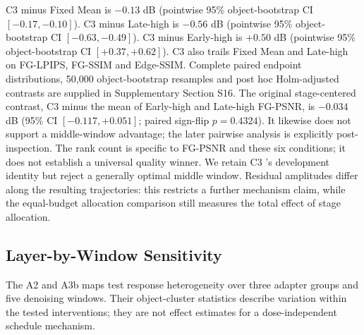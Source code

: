 \documentclass[times,twocolumn,final]{elsarticle}
\providecommand{\DIFadd}[1]{{\protect\color{blue} \sf #1}} %
\providecommand{\DIFaddbegin}{} %
\providecommand{\DIFaddend}{} %
\begin{document}
  \DIFaddbegin \DIFadd{C3 minus Fixed Mean is $-0.13$ dB (pointwise 95\% object-bootstrap CI $[-0.17,-0.10]$). C3 minus Late-high is $-0.56$ dB (pointwise 95\% object-bootstrap CI $[-0.63,-0.49]$). C3 minus Early-high is $+0.50$ dB (pointwise 95\% object-bootstrap CI $[+0.37,+0.62]$). C3 also trails Fixed Mean and Late-high on FG-LPIPS, }\DIFaddend FG-SSIM and   \DIFaddbegin \DIFadd{Edge-SSIM. Complete paired endpoint distributions, 50,000 object-bootstrap resamples and post hoc Holm-adjusted contrasts are supplied in Supplementary Section S16. The original stage-centered contrast, C3 minus the mean of Early-high and Late-high FG-PSNR, is $-0.034$ dB (95\% CI $[-0.117,+0.051]$; paired sign-flip $p=0.4324$)}\DIFaddend .   \DIFaddbegin \DIFadd{It likewise does not support a middle-window advantage; the later pairwise analysis is explicitly post-inspection. The rank count is specific to FG-PSNR and these six conditions; it does not establish a universal quality winner. We retain }\DIFaddend C3  \DIFaddbegin \DIFadd{'s development identity but reject a generally optimal middle window. Residual amplitudes differ along the resulting trajectories: this restricts a further mechanism claim, while the equal-budget allocation comparison still measures the total effect of stage allocation.
}\DIFaddend 

  \DIFaddbegin \subsection{Layer-by-Window Sensitivity}
\label{subsec:layerwindow}

\DIFadd{The A2 }\DIFaddend and   \DIFaddbegin \DIFadd{A3b maps test response heterogeneity over three adapter groups and five denoising windows. Their object-cluster statistics describe variation within the tested interventions; they are not effect estimates for a dose-independent schedule mechanism}\DIFaddend .
\end{document}
